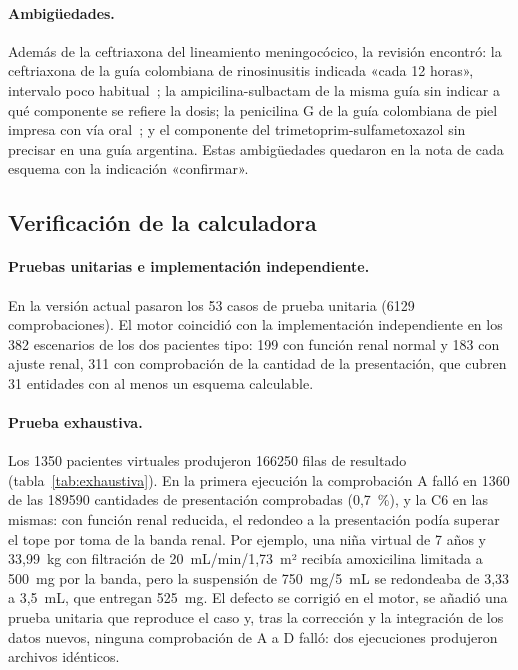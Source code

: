 \documentclass[11pt,a4paper]{article}
\begin{document}
\paragraph{Ambigüedades.} Además de la ceftriaxona del lineamiento meningocócico, la revisión encontró: la ceftriaxona de la guía colombiana de rinosinusitis indicada «cada 12 horas», intervalo poco habitual~\citep{acorlrs2024}; la ampicilina-sulbactam de la misma guía sin indicar a qué componente se refiere la dosis; la penicilina G de la guía colombiana de piel impresa con vía oral~\citep{acin2023}; y el componente del trimetoprim-sulfametoxazol sin precisar en una guía argentina. Estas ambigüedades quedaron en la nota de cada esquema con la indicación «confirmar».

\subsection{Verificación de la calculadora}

\paragraph{Pruebas unitarias e implementación independiente.} En la versión actual pasaron los 53 casos de prueba unitaria (\num{6129} comprobaciones). El motor coincidió con la implementación independiente en los 382 escenarios de los dos pacientes tipo: 199 con función renal normal y 183 con ajuste renal, 311 con comprobación de la cantidad de la presentación, que cubren 31 entidades con al menos un esquema calculable.

\paragraph{Prueba exhaustiva.} Los \num{1350} pacientes virtuales produjeron \num{166250} filas de resultado (tabla~\ref{tab:exhaustiva}). En la primera ejecución la comprobación A falló en \num{1360} de las \num{189590} cantidades de presentación comprobadas (0,7~\%), y la C6 en las mismas: con función renal reducida, el redondeo a la presentación podía superar el tope por toma de la banda renal. Por ejemplo, una niña virtual de 7 años y 33,99~kg con filtración de 20~mL/min/1,73~m² recibía amoxicilina limitada a 500~mg por la banda, pero la suspensión de 750~mg/5~mL se redondeaba de 3,33 a 3,5~mL, que entregan 525~mg. El defecto se corrigió en el motor, se añadió una prueba unitaria que reproduce el caso y, tras la corrección y la integración de los datos nuevos, ninguna comprobación de A a D falló: dos ejecuciones produjeron archivos idénticos.
\end{document}
